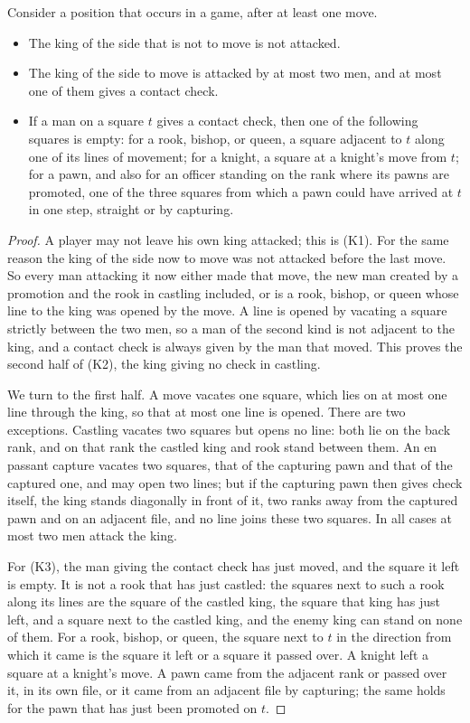 \documentclass[12pt,reqno]{article}
\begin{document}
\begin{lemma}\label{lemcheck}
Consider a position that occurs in a game, after at least one move.
\begin{itemize}
\item[(K1)] The king of the side that is not to move is not attacked.
\item[(K2)] The king of the side to move is attacked by at most two men, and at most one of them
gives a contact check.
\item[(K3)] If a man on a square $t$ gives a contact check, then one of the following squares is
empty: for a rook, bishop, or queen, a square adjacent to $t$ along one of its lines of movement;
for a knight, a square at a knight's move from $t$; for a pawn, and also for an officer standing
on the rank where its pawns are promoted, one of the three squares from which a pawn could have
arrived at $t$ in one step, straight or by capturing.
\end{itemize}
\end{lemma}

\begin{proof}
A player may not leave his own king attacked; this is (K1). For the same reason the king of the
side now to move was not attacked before the last move. So every man attacking it now either
made that move, the new man created by a promotion and the rook in castling included, or is a
rook, bishop, or queen whose line to the king was opened by the move. A line is opened by
vacating a square strictly between the two men, so a man of the second kind is not adjacent to
the king, and a contact check is always given by the man that moved. This proves the second
half of (K2), the king giving no check in castling.

We turn to the first half. A move vacates one square, which lies on at most one line through
the king, so that at most one line is opened. There are two exceptions. Castling vacates two
squares but opens no line: both lie on the back rank, and on that rank the castled king and rook
stand between them. An en passant capture vacates two
squares, that of the capturing pawn and that of the captured one, and may open two lines; but
if the capturing pawn then gives check itself, the king stands diagonally in front of it, two
ranks away from the captured pawn and on an adjacent file, and no line joins these two squares.
In all cases at most two men attack the king.

For (K3), the man giving the contact check has just moved, and the square it left is empty. It
is not a rook that has just castled: the squares next to such a rook along its lines are the
square of the castled king, the square that king has just left, and a square next to the castled
king, and the enemy king can stand on none of them.
For a rook, bishop, or queen, the square next to $t$ in the direction from which it came is the
square it left or a square it passed over. A knight left a square at a knight's move. A pawn came
from the adjacent rank or passed over it, in its own file, or it came from an adjacent file by
capturing; the same holds for the pawn that has just been promoted on $t$.
\end{proof}
\end{document}
